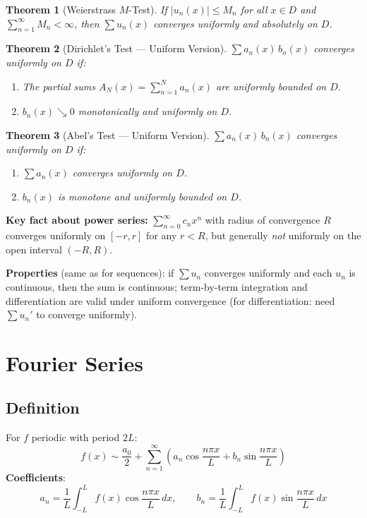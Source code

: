 \documentclass[12pt, a4paper]{article}
\newtheorem{theorem}{Theorem}[section]
\theoremstyle{definition}
\theoremstyle{remark}
\begin{document}
\begin{theorem}[Weierstrass $M$-Test]
If $|u_n(x)| \leq M_n$ for all $x \in D$ and $\displaystyle\sum_{n=1}^\infty M_n < \infty$, then
$\sum u_n(x)$ converges \emph{uniformly and absolutely} on $D$.
\end{theorem}

\begin{theorem}[Dirichlet's Test --- Uniform Version]
$\sum a_n(x)\,b_n(x)$ converges uniformly on $D$ if:
\begin{enumerate}
  \item The partial sums $A_N(x) = \sum_{n=1}^N a_n(x)$ are \emph{uniformly bounded} on $D$.
  \item $b_n(x) \searrow 0$ monotonically and \emph{uniformly} on $D$.
\end{enumerate}
\end{theorem}

\begin{theorem}[Abel's Test --- Uniform Version]
$\sum a_n(x)\,b_n(x)$ converges uniformly on $D$ if:
\begin{enumerate}
  \item $\sum a_n(x)$ converges \emph{uniformly} on $D$.
  \item $b_n(x)$ is monotone and \emph{uniformly bounded} on $D$.
\end{enumerate}
\end{theorem}

\textbf{Key fact about power series:} $\displaystyle\sum_{n=0}^\infty c_n x^n$ with radius of convergence $R$ converges
uniformly on $[-r,r]$ for any $r < R$, but generally \emph{not} uniformly on the open interval $(-R,R)$.

\textbf{Properties} (same as for sequences): if $\sum u_n$ converges uniformly and each $u_n$ is continuous, then the sum is continuous; term-by-term integration and differentiation are valid under uniform convergence (for differentiation: need $\sum u_n'$ to converge uniformly).

\section{Fourier Series}

\subsection{Definition}
For $f$ periodic with period $2L$:
\[
  f(x) \sim \frac{a_0}{2} + \sum_{n=1}^\infty
  \left( a_n \cos\frac{n\pi x}{L} + b_n \sin\frac{n\pi x}{L} \right)
\]
\textbf{Coefficients}:
\[
  a_n = \frac{1}{L}\int_{-L}^{L} f(x)\cos\frac{n\pi x}{L}\,dx,
  \qquad
  b_n = \frac{1}{L}\int_{-L}^{L} f(x)\sin\frac{n\pi x}{L}\,dx
\]
\end{document}
